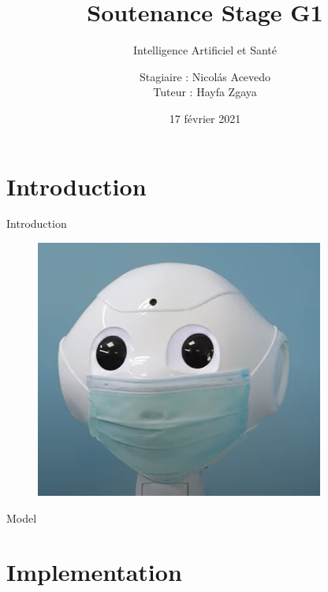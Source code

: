 \documentclass{cubeamer}
\title{Soutenance Stage G1}
\subtitle{Intelligence Artificiel et Santé}
\author[Nicolás Acevedo]{Stagiaire : Nicolás Acevedo \\ Tuteur : Hayfa Zgaya}
\date{17 février 2021} %
\institute[École Centrale de Lille]{}
\begin{document}
\maketitle


\section{Introduction}

\begin{frame}{Introduction}
	\begin{figure}
		\includegraphics[height = 0.7\textheight]{img/peppermask.png}
	\end{figure}
\end{frame}

\begin{frame}{Model}

\end{frame}

\section{Implementation}

\begin{frame}[fragile]
	\begin{lstlisting}
		
	\end{lstlisting}
	
\end{frame}
\end{document}
